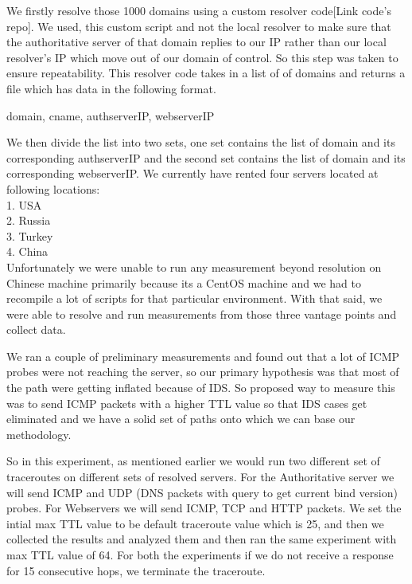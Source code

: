 We firstly resolve those 1000 domains using a custom resolver code[Link code's repo]. We used, this custom script and not the local resolver to make sure that the authoritative server of that domain replies to our IP rather than our local resolver's IP which move out of our domain of control. So this step was taken to ensure repeatability. This resolver code takes in a list of of domains and returns a file which has data in the following format. \\ 
\begin{center}
   domain, cname, authserverIP, webserverIP \\    
\end{center}
We then divide the list into two sets, one set contains the list of domain and its corresponding authserverIP and the second set contains the list of domain and its corresponding webserverIP. We currently have rented four servers located at following locations: \\
1. USA\\
2. Russia\\
3. Turkey\\
4. China\\

Unfortunately we were unable to run any measurement beyond resolution on Chinese machine primarily because its a CentOS machine and we had to recompile a lot of scripts for that particular environment. With that said, we were able to resolve and run measurements from those three vantage points and collect data. 

We ran a couple of preliminary measurements and found out that a lot of ICMP probes were not reaching the server, so our primary hypothesis was that most of the path were getting inflated because of IDS. So proposed way to measure this was to send ICMP packets with a higher TTL value so that IDS cases get eliminated and we have a solid set of paths onto which we can base our methodology. 


So in this experiment, as mentioned earlier we would run two different set of traceroutes on different sets of resolved servers. For the Authoritative server we will send ICMP and UDP (DNS packets with query to get current bind version) probes. For Webservers we will send ICMP, TCP and HTTP packets. We set the intial max TTL value to be default traceroute value which is 25, and then we collected the results and analyzed them and then ran the same experiment with max TTL value of 64. For both the experiments if we do not receive a response for 15 consecutive hops, we terminate the traceroute.

